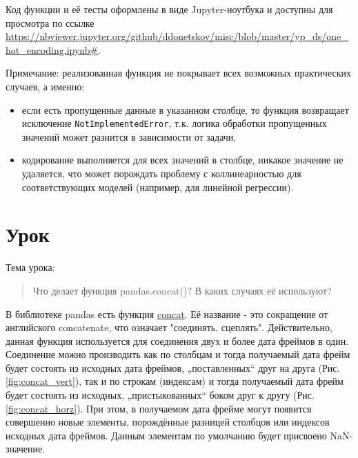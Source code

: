 \documentclass[a4paper,12pt]{article}
\newcommand{\lapki}[1]{„#1“}
\begin{document}
Код функции и её тесты оформлены в виде Jupyter-ноутбука и доступны для просмотра по ссылке \url{https://nbviewer.jupyter.org/github/ddonetskov/misc/blob/master/yp_ds/one_hot_encoding.ipynb#}.

\medskip

{\color{red} \faExclamation} Примечание: реализованная функция не покрывает всех возможных практических случаев, а именно:

\begin{itemize}
\item если есть пропущенные данные в указанном столбце, то функция возвращает исключение \texttt{NotImplementedError}, т.к. логика обработки пропущенных значений может разнится в зависимости от задачи,
\item кодирование выполняется для всех значений в столбце, никакое значение не удаляется, что может порождать проблему с коллинеарностью для соответствующих моделей (например, для линейной регрессии).
\end{itemize}


\section{Урок}

Тема урока:

\begin{quote}
Что делает функция pandas.concat()? В каких случаях её используют?
\end{quote}

В библиотеке pandas есть функция \href{https://pandas.pydata.org/pandas-docs/stable/reference/api/pandas.concat.html}{concat}. Её название - это сокращение от английского concatenate, что означает "соединять, сцеплять". Действительно, данная функция используется для соединения двух и более дата фреймов в один. Соединение можно производить как по столбцам и тогда получаемый дата фрейм будет состоять из исходных дата фреймов, \lapki{поставленных} друг на друга (Рис. \ref{fig:concat_vert}), так и по строкам (индексам) и тогда получаемый дата фрейм будет состоять из исходных, \lapki{пристыкованных} боком друг к другу (Рис. \ref{fig:concat_horz}). При этом, в получаемом дата фрейме могут появится совершенно новые элементы, порождённые разницей столбцов или индексов исходных дата фреймов. Данным элементам по умолчанию будет присвоено NaN-значение.
\end{document}
